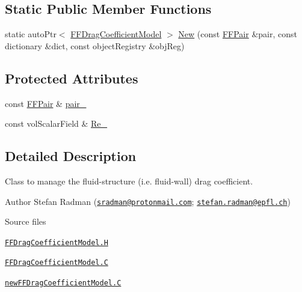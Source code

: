 \subsection*{Static Public Member Functions}
\begin{DoxyCompactItemize}
\item 
static auto\+Ptr$<$ \hyperlink{classFoam_1_1FFDragCoefficientModel}{F\+F\+Drag\+Coefficient\+Model} $>$ \hyperlink{classFoam_1_1FFDragCoefficientModel_aab6011f9f571b256c847fdb2c488a5d3}{New} (const \hyperlink{classFoam_1_1FFPair}{F\+F\+Pair} \&pair, const dictionary \&dict, const object\+Registry \&obj\+Reg)
\end{DoxyCompactItemize}
\subsection*{Protected Attributes}
\begin{DoxyCompactItemize}
\item 
const \hyperlink{classFoam_1_1FFPair}{F\+F\+Pair} \& \hyperlink{classFoam_1_1FFDragCoefficientModel_ad015e769561f394d7c717d4356dcded4}{pair\+\_\+}
\item 
const vol\+Scalar\+Field \& \hyperlink{classFoam_1_1FFDragCoefficientModel_a048c59a4c6018dbef125c5d840ada714}{Re\+\_\+}
\end{DoxyCompactItemize}


\subsection{Detailed Description}
Class to manage the fluid-\/structure (i.\+e. fluid-\/wall) drag coefficient. 

\label{_Description}%
 Author Stefan Radman (\href{mailto:sradman@protonmail.com}{\tt sradman@protonmail.\+com}; \href{mailto:stefan.radman@epfl.ch}{\tt stefan.\+radman@epfl.\+ch})

\begin{DoxyParagraph}{Source files}

\begin{DoxyItemize}
\item \href{../../../home/carlo/data/GeN-Foam/GeN-Foam_ffn/GeN-Foam/GeN-Foam/classes/thermalHydraulics/src/physicsModels/dragModels/FFDragCoefficientModels/FFDragCoefficientModel.H}{\tt F\+F\+Drag\+Coefficient\+Model.\+H} 
\item \href{../../../home/carlo/data/GeN-Foam/GeN-Foam_ffn/GeN-Foam/GeN-Foam/classes/thermalHydraulics/src/physicsModels/dragModels/FFDragCoefficientModels/FFDragCoefficientModel.C}{\tt F\+F\+Drag\+Coefficient\+Model.\+C} 
\item \href{../../../home/carlo/data/GeN-Foam/GeN-Foam_ffn/GeN-Foam/GeN-Foam/classes/thermalHydraulics/src/physicsModels/dragModels/FFDragCoefficientModels/newFFDragCoefficientModel.C}{\tt new\+F\+F\+Drag\+Coefficient\+Model.\+C} 
\end{DoxyItemize}
\end{DoxyParagraph}


